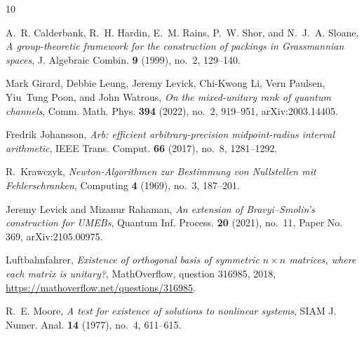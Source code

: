 \documentclass[11pt]{amsart}
\theoremstyle{definition}
\theoremstyle{remark}
\begin{document}

\providecommand{\bysame}{\leavevmode\hbox to3em{\hrulefill}\thinspace}
\providecommand{\MR}{\relax\ifhmode\unskip\space\fi MR }
\providecommand{\MRhref}[2]{%
  \href{http://www.ams.org/mathscinet-getitem?mr=#1}{#2}
}
\providecommand{\href}[2]{#2}
\begin{thebibliography}{10}

A.~R. Calderbank, R.~H. Hardin, E.~M. Rains, P.~W. Shor, and N.~J.~A. Sloane,
  \emph{A group-theoretic framework for the construction of packings in
  {G}rassmannian spaces}, J. Algebraic Combin. \textbf{9} (1999), no.~2,
  129--140.

Mark Girard, Debbie Leung, Jeremy Levick, Chi-Kwong Li, Vern Paulsen, Yiu~Tung
  Poon, and John Watrous, \emph{On the mixed-unitary rank of quantum channels},
  Comm. Math. Phys. \textbf{394} (2022), no.~2, 919--951, arXiv:2003.14405.

Fredrik Johansson, \emph{Arb: efficient arbitrary-precision midpoint-radius
  interval arithmetic}, IEEE Trans. Comput. \textbf{66} (2017), no.~8,
  1281--1292.

R.~Krawczyk, \emph{{N}ewton-{A}lgorithmen zur {B}estimmung von {N}ullstellen
  mit {F}ehlerschranken}, Computing \textbf{4} (1969), no.~3, 187--201.

Jeremy Levick and Mizanur Rahaman, \emph{An extension of {B}ravyi--{S}molin's
  construction for {UMEB}s}, Quantum Inf. Process. \textbf{20} (2021), no.~11,
  Paper No. 369, arXiv:2105.00975.

Luftbahnfahrer, \emph{Existence of orthogonal basis of symmetric $n\times n$
  matrices, where each matrix is unitary?}, MathOverflow, question 316985,
  2018, \url{https://mathoverflow.net/questions/316985}.

R.~E. Moore, \emph{A test for existence of solutions to nonlinear systems},
  SIAM J. Numer. Anal. \textbf{14} (1977), no.~4, 611--615.


\end{thebibliography}
\end{document}
